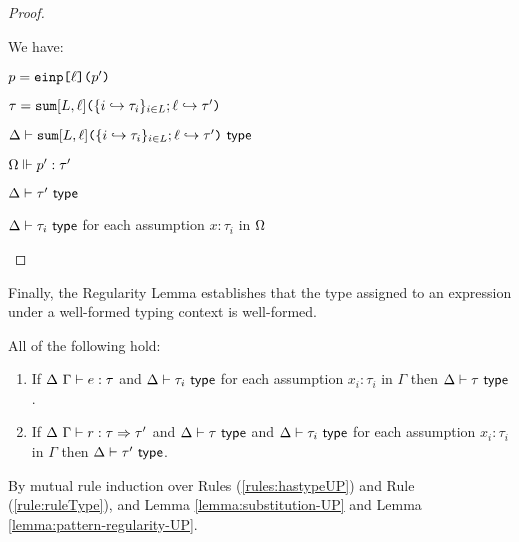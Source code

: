{{{{\begin{proof}
\begin{byCases}
\begin{pfsteps*}
\end{pfsteps*}
\resetpfcounter
\item[\text{(\ref{rule:patType-inj})}] We have:
\begin{pfsteps*}
  \item $p=\texttt{einp}\texttt{[}\ell\texttt{](}p'\texttt{)}$ 
  \item $\tau=\texttt{sum}[L, \ell]\texttt{(}\{i \hookrightarrow \tau_{i}\}_{i \in L}; \ell \hookrightarrow \tau'\texttt{)}$ 
  \item $\Delta \vdash \texttt{sum}[L, \ell]\texttt{(}\{i \hookrightarrow \tau_{i}\}_{i \in L}; \ell \hookrightarrow \tau'\texttt{)}~\mathsf{type}$  
  \item $\Omega \Vdash p' : \tau'$  
  \item $\Delta \vdash \tau'~\mathsf{type}$   
  \item $\Delta \vdash \tau_i~\mathsf{type}$ for each assumption $x : \tau_i$ in $\Omega$ 
\end{pfsteps*}
\end{byCases}
\end{proof}

Finally, the Regularity Lemma establishes that the type assigned to an expression under a well-formed typing context is well-formed. 
\begin{lemma}[Regularity]\label{lemma:regularity-UP} All of the following hold:
\begin{enumerate}
\item If $\Delta~\Gamma \vdash e : \tau$ and $\Delta \vdash \tau_i~\mathsf{type}$ for each assumption $x_i : \tau_i$ in $\Gamma$ then $\Delta \vdash \tau~\mathsf{type}$.
\item If $\Delta~\Gamma \vdash r : \tau \Rightarrow \tau'$ and $\Delta \vdash \tau~\mathsf{type}$ and $\Delta \vdash \tau_i~\mathsf{type}$ for each assumption $x_i : \tau_i$ in $\Gamma$ then $\Delta \vdash \tau'~\mathsf{type}$.
\end{enumerate}
\end{lemma}
\begin{proof-sketch} By mutual rule induction over Rules (\ref{rules:hastypeUP}) and Rule (\ref{rule:ruleType}), and Lemma \ref{lemma:substitution-UP} and Lemma \ref{lemma:pattern-regularity-UP}.
\end{proof-sketch}
}}}}
